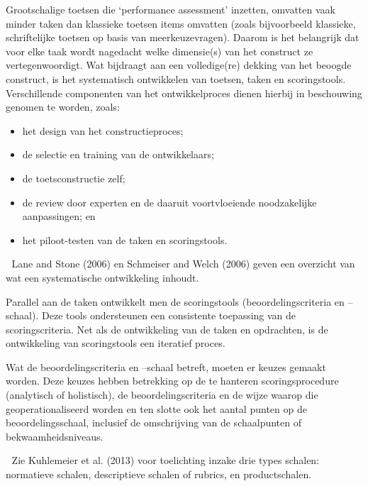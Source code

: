 \documentclass[
  letterpaper,
]{report}
\providecommand{\tightlist}{%
  \setlength{\itemsep}{0pt}\setlength{\parskip}{0pt}}
\begin{document}
Grootschalige toetsen die `performance assessment' inzetten, omvatten
vaak minder taken dan klassieke toetsen items omvatten (zoals
bijvoorbeeld klassieke, schriftelijke toetsen op basis van
meerkeuzevragen). Daarom is het belangrijk dat voor elke taak wordt
nagedacht welke dimensie(s) van het construct ze vertegenwoordigt. Wat
bijdraagt aan een volledige(re) dekking van het beoogde construct, is
het systematisch ontwikkelen van toetsen, taken en scoringstools.
Verschillende componenten van het ontwikkelproces dienen hierbij in
beschouwing genomen te worden, zoals:

\begin{itemize}
\tightlist
\item
  het design van het constructieproces;
\item
  de selectie en training van de ontwikkelaars;
\item
  de toetsconstructie zelf;
\item
  de review door experten en de daaruit voortvloeiende noodzakelijke
  aanpassingen; en
\item
  het piloot-testen van de taken en scoringstools.
\end{itemize}

📖 Lane and Stone (2006) en Schmeiser and Welch (2006) geven een
overzicht van wat een systematische ontwikkeling inhoudt.

Parallel aan de taken ontwikkelt men de scoringstools
(beoordelingscriteria en --schaal). Deze tools ondersteunen een
consistente toepassing van de scoringscriteria. Net als de ontwikkeling
van de taken en opdrachten, is de ontwikkeling van scoringstools een
iteratief proces.

Wat de beoordelingscriteria en --schaal betreft, moeten er keuzes
gemaakt worden. Deze keuzes hebben betrekking op de te hanteren
scoringsprocedure (analytisch of holistisch), de beoordelingscriteria en
de wijze waarop die geoperationaliseerd worden en ten slotte ook het
aantal punten op de beoordelingsschaal, inclusief de omschrijving van de
schaalpunten of bekwaamheidsniveaus.

📖 Zie Kuhlemeier et al. (2013) voor toelichting inzake drie types
schalen: normatieve schalen, descriptieve schalen of rubrics, en
productschalen.
\end{document}
